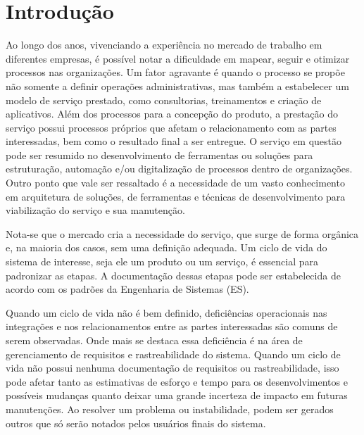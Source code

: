 
\chapter{Introdução}\label{chap:introducao} %

	Ao longo dos anos, vivenciando a experiência no mercado de trabalho em diferentes 
	empresas, é possível notar a dificuldade em mapear, seguir e otimizar processos 
	nas organizações. Um fator agravante é quando o processo se propõe não somente a definir operações administrativas, mas também a estabelecer um modelo de 
	serviço prestado, como consultorias, treinamentos e criação de aplicativos. Além 
	dos processos para a concepção do produto, a prestação do 
	serviço possui processos próprios que afetam o relacionamento com as partes interessadas,
	bem como o resultado final a ser entregue. O serviço em questão pode ser resumido no desenvolvimento de 
	ferramentas ou soluções para estruturação, automação e/ou digitalização de processos dentro 
	de organizações. Outro ponto que vale ser ressaltado é a necessidade de um vasto conhecimento 
	em arquitetura de soluções, de ferramentas e técnicas de desenvolvimento para 
	viabilização do serviço e sua manutenção.

	Nota-se que o mercado cria a necessidade do serviço, que 
	surge de forma orgânica e, na maioria dos casos, sem uma definição adequada. Um ciclo 
	de vida do sistema de interesse, seja ele um produto ou um serviço, é essencial para 
	padronizar as etapas. A documentação dessas etapas pode ser estabelecida de acordo com 
	os padrões da Engenharia de Sistemas (ES). 

	Quando um ciclo de vida não é bem definido, deficiências operacionais nas integrações 
	e nos relacionamentos entre as partes interessadas são comuns de serem observadas. 
	Onde mais se destaca essa deficiência é na área de gerenciamento de requisitos e 
	rastreabilidade do sistema. Quando um ciclo de vida não possui nenhuma documentação de 
	requisitos ou rastreabilidade, isso pode afetar tanto as estimativas de esforço e tempo 
	para os desenvolvimentos e possíveis mudanças quanto deixar uma grande incerteza de impacto 
	em futuras manutenções. Ao resolver um problema ou instabilidade, podem ser gerados outros 
	que só serão notados pelos usuários finais do sistema.

